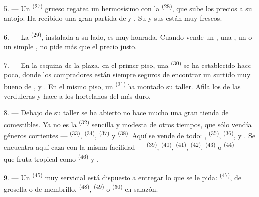 5. --- Un  \textsuperscript{(27)} grueso regatea un hermosísimo
 con la  \textsuperscript{(28)}, que sube los precios a
su antojo. Ha recibido una gran partida de  y . Su  y sus 
están muy frescos.

\VUsaut{4.0mm}
\VUsaut{3.0mm}

6. --- La  \textsuperscript{(29)}, instalada a su lado, es muy honrada.
Cuando vende un , una , un  o un
simple , no pide más que el precio justo.

7. --- En la esquina de la plaza, en el primer piso, una
 \textsuperscript{(30)} se ha establecido hace poco, donde los
compradores están siempre seguros de encontrar un surtido muy bueno de
,  y . En el mismo piso, un  \textsuperscript{(31)} ha montado su
taller. Afila los  de las verduleras y hace a los
hortelanos  del  más duro.

\VUsaut{4.0mm}
\VUsaut{3.0mm}

8. --- Debajo de su taller se ha abierto no hace mucho una gran tienda de
comestibles. Ya no es la  \textsuperscript{(32)} sencilla
y modesta de otros tiempos, que sólo vendía géneros corrientes ---
 \textsuperscript{(33)},  \textsuperscript{(34)},
 \textsuperscript{(37)} y  \textsuperscript{(38)}. Aquí se
vende de todo: , 
\textsuperscript{(35)},  \textsuperscript{(36)},  y . Se encuentra aquí caza con la misma facilidad ---
 \textsuperscript{(39)},  \textsuperscript{(40)},
 \textsuperscript{(41)},  \textsuperscript{(42)},
 \textsuperscript{(43)} o  \textsuperscript{(44)} ---
que fruta tropical como  \textsuperscript{(46)} y .

9. --- Un  \textsuperscript{(45)} muy servicial está dispuesto a
entregar lo que se le pida:  \textsuperscript{(47)}, de grosella o
de membrillo,  \textsuperscript{(48)}, 
\textsuperscript{(49)} o  \textsuperscript{(50)} en salazón.

